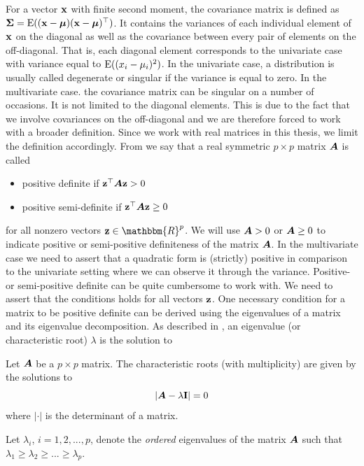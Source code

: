 \documentclass[oneside]{book}\usepackage{knitr}
\begin{document}
For a vector $\mathbf{x}$ with finite second moment, the covariance matrix is defined as $\mathbf{\Sigma}=\operatorname{E}((\mathbf{x} - \mbox{\boldmath$\mu$})(\mathbf{x} - \mbox{\boldmath$\mu$})^\top)$. 
It contains the variances of each individual element of $\mathbf{x}$ on the diagonal as well as the covariance between every pair of elements on the off-diagonal. 
That is, each diagonal element corresponds to the univariate case with variance equal to $\operatorname{E}((x_i - \mu_i)^2)$. 
In the univariate case, a distribution is usually called degenerate or singular if the variance is equal to zero. 
In the multivariate case. the covariance matrix can be singular on a number of occasions. 
It is not limited to the diagonal elements.
This is due to the fact that we involve covariances on the off-diagonal and we are therefore forced to work with a broader definition.  
Since we work with real matrices in this thesis, we limit the definition accordingly. 
From \textcite[ch 14.2]{harville1997matrix} we say that a real symmetric $p\times p$ matrix $\mbox{\boldmath$A$}$ is called 
\begin{itemize}
	\item positive definite if $\mathbf{z}^\top \mbox{\boldmath$A$} \mathbf{z} > 0$
	\item positive semi-definite if $\mathbf{z}^\top \mbox{\boldmath$A$} \mathbf{z} \geq 0$
\end{itemize}
for all nonzero vectors $\bz \in \mathbbm{R}^p$.
We will use $\mbox{\boldmath$A$} > 0$ or $\mbox{\boldmath$A$} \geq 0$ to indicate positive or semi-positive definiteness of the matrix $\mbox{\boldmath$A$}$. 
In the multivariate case we need to assert that a quadratic form is (strictly) positive in comparison to the univariate setting where we can observe it through the variance. 
Positive- or semi-positive definite can be quite cumbersome to work with. 
We need to assert that the conditions holds for all vectors $\mathbf{z}$. 
One necessary condition for a matrix to be positive definite can be derived using the eigenvalues of a matrix and its eigenvalue decomposition. 
As described in \textcite[ch. 21]{harville1997matrix}, an eigenvalue (or characteristic root) $\lambda$ is the solution to 
\begin{definition}\label{def:eigenvalue} 
	Let $\mbox{\boldmath$A$}$ be a $p\times p$ matrix. The characteristic roots (with multiplicity) are given by the solutions to
	\begin{equation*}
		\left|\mbox{\boldmath$A$} - \lambda \mathbf{I}\right| = 0
	\end{equation*}
	where $|\cdot|$ is the determinant of a matrix.
\end{definition} 
Let $\lambda_i$, $i=1,2,...,p$, denote the \textit{ordered} eigenvalues of the matrix $\mbox{\boldmath$A$}$ such that $\lambda_1\geq \lambda_2 \geq ... \geq \lambda_p$.
\end{document}
